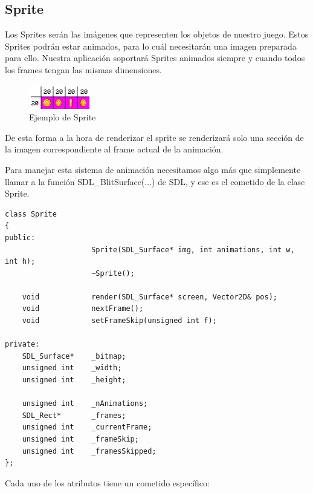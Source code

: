 \documentclass[parskip=half*]{scrartcl}
\begin{document}
	\subsection{Sprite}
		Los Sprites ser\'an las im\'agenes que representen los objetos de nuestro juego. Estos Sprites podr\'an estar animados, para lo cu\'al necesitar\'an una imagen preparada para ello. Nuestra aplicaci\'on soportar\'a Sprites animados siempre y cuando todos los frames tengan las mismas dimensiones.

		\begin{figure}[h]
			\centering
			\includegraphics{MulticocoSDL/img/sprite_example.png}
			\caption{Ejemplo de Sprite}
		\end{figure}

		De esta forma a la hora de renderizar el sprite se renderizar\'a solo una secci\'on de la imagen correspondiente al frame actual de la animaci\'on.

		Para manejar esta sistema de animaci\'on necesitamos algo m\'as que simplemente llamar a la funci\'on SDL\_BlitSurface(...) de SDL, y ese es el cometido de la clase Sprite.

		\begin{lstlisting}
class Sprite
{
public:
                    Sprite(SDL_Surface* img, int animations, int w, int h);
                    ~Sprite();
    
    void            render(SDL_Surface* screen, Vector2D& pos);
    void            nextFrame();
    void            setFrameSkip(unsigned int f);
    
private:
    SDL_Surface*    _bitmap;
    unsigned int    _width;
    unsigned int    _height;

    unsigned int    _nAnimations;
    SDL_Rect*       _frames;
    unsigned int    _currentFrame;    
    unsigned int    _frameSkip;
    unsigned int    _framesSkipped;
};
		\end{lstlisting}

		Cada uno de los atributos tiene un cometido espec\'ifico:
\end{document}
